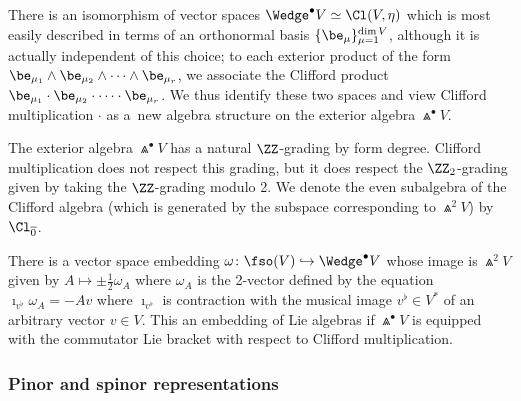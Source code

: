 There is an isomorphism of vector spaces $\Wedge^\bullet V\simeq \Cl(V,\eta)$ which is most easily described in terms of an orthonormal basis $\{\be_\mu\}_{\mu=1}^{\dim V}$, although it is actually independent of this choice; to each exterior product of the form $\be_{\mu_1}\wedge\be_{\mu_2}\wedge\cdots\wedge\be_{\mu_r}$, we associate the Clifford product~${\be_{\mu_1}\cdot\be_{\mu_2}\cdot\cdots\cdot\be_{\mu_r}}$. We thus identify these two spaces and view Clifford multiplication $\cdot$ as a~new algebra structure on the exterior algebra $\Wedge^\bullet V$.

The exterior algebra $\Wedge^\bullet V$ has a natural $\ZZ$-grading by form degree. Clifford multiplication does not respect this grading, but it does respect the $\ZZ_2$-grading given by taking the $\ZZ$-grading modulo 2. We denote the even subalgebra of the Clifford algebra \big(which is generated by the subspace corresponding to $\Wedge^2 V$\big) by $\Cl_{\overline0}$.

There is a vector space embedding $\omega\colon\fso(V)\hookrightarrow\Wedge^\bullet V$ whose image is $\Wedge^2 V$ given by $A\mapsto \pm\frac{1}{2}\omega_A$ where $\omega_A$ is the 2-vector defined by the equation
$\imath_{v^\flat}\omega_A = -Av
$
where $\imath_{v^\flat}$ is contraction with the musical image $v^\flat\in V^*$ of an arbitrary vector $v\in V$.
This an embedding of Lie algebras if $\Wedge^\bullet V$ is equipped with the commutator Lie bracket with respect to Clifford multiplication.

\subsubsection{Pinor and spinor representations}
\label{sec:pinor-spinor}

